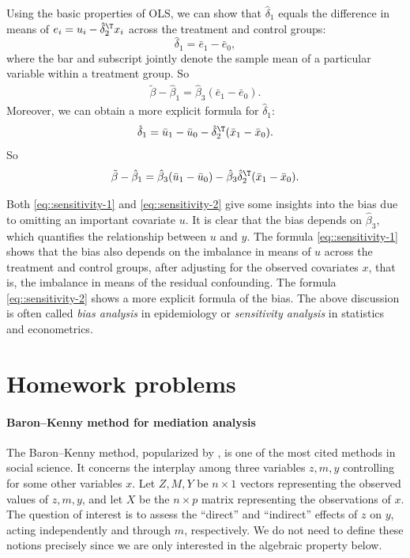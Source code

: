 Using the basic properties of OLS, we can show that $\hat{\delta}_1$ equals the difference in means of $e_i =  u_i -   \hat{\delta}_2^{\T} x_i$ across the treatment and control groups:
$$
\hat{\delta}_1 = \bar{e}_1 - \bar{e}_0,
$$
where the bar and subscript jointly denote the sample mean of a particular variable within a treatment group.
So
\begin{eqnarray} \label{eq::sensitivity-1}
\tilde{\beta} - \hat{\beta}_1 =  \hat{\beta}_3  ( \bar{e}_1 - \bar{e}_0).
\end{eqnarray} 
Moreover, we can obtain a more explicit formula for $\hat{\delta}_1$: 
$$
\hat{\delta}_1 = \bar{u}_1 - \bar{u}_0 -  \hat{\delta}_2^{\T}  ( \bar{x}_1 - \bar{x}_0 ).
$$
So
\begin{eqnarray} \label{eq::sensitivity-2}
\tilde{\beta} - \hat{\beta}_1 =  \hat{\beta}_3(\bar{u}_1 - \bar{u}_0) -  \hat{\beta}_3\hat{\delta}_2^{\T}  ( \bar{x}_1 - \bar{x}_0 ).
\end{eqnarray} 

Both \eqref{eq::sensitivity-1} and \eqref{eq::sensitivity-2} give some insights into the bias due to omitting an important covariate $u$. It is clear that the bias depends on $ \hat{\beta}_3$, which quantifies the relationship between $u$ and $y$. The formula \eqref{eq::sensitivity-1} shows that the bias also depends on the imbalance in means of $u$ across the treatment and control groups, after adjusting for the observed covariates $x$, that is, the imbalance in means of the residual confounding. The formula \eqref{eq::sensitivity-2} shows a more explicit formula of the bias. The above discussion is often called {\it bias analysis} in epidemiology or {\it sensitivity analysis} in statistics and econometrics. 




\section{Homework problems}


\paragraph{Baron--Kenny method for mediation analysis}
\label{hw07::baron-kenney}

The Baron--Kenny method, popularized by \citet{baron1986moderator}, is one of the most cited methods in social science. 
It concerns the interplay among three variables $z, m, y$ controlling for some other variables $x$. Let $Z, M, Y$ be  $n\times 1$ vectors representing the observed values of $z, m, y$, and let $X$ be the $n\times p$ matrix representing the observations of $x$. The question of interest is to assess the ``direct'' and ``indirect'' effects of $z$ on $y$, acting independently and through $m$, respectively. We do not need to define these notions precisely since we are only interested in the algebraic property below. 


